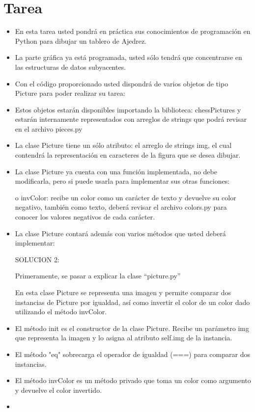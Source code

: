 \documentclass{article}
\begin{document}
	\section{Tarea}
	\begin{itemize}		

 
        \item En esta tarea usted pondrá en práctica sus conocimientos de programación en Python para dibujar un tablero de Ajedrez.
        \item La parte gráfica ya está programada, usted sólo tendrá que concentrarse en las estructuras de datos subyacentes.
        \item Con el código proporcionado usted dispondrá de varios objetos de tipo Picture para poder realizar su tarea:
        \item Estos objetos estarán disponibles importando la biblioteca: chessPictures y estarán internamente representados con arreglos de strings que podrá revisar en el archivo pieces.py 
        \item La clase Picture tiene un sólo atributo: el arreglo de strings img, el cual contendrá la representación en caracteres de la figura que se desea dibujar.

        \item La clase Picture ya cuenta con una función implementada, no debe modificarla, pero si puede usarla para implementar sus otras funciones:

        o invColor: recibe un color como un carácter de texto y devuelve su color negativo, también como texto, deberá revisar el archivo colors.py para conocer los valores negativos de cada carácter.

        \item La clase Picture contará además con varios métodos que usted deberá implementar:

        SOLUCION 2:

        Primeramente, se pasar a explicar la clase “picture.py”
        
        En esta clase Picture se representa una imagen y permite comparar dos instancias de Picture por 
        igualdad, así como invertir el color de un color dado utilizando el método invColor.
        
        \item El método init es el constructor de la clase Picture. Recibe un parámetro img que representa la imagen y lo asigna al atributo self.img de la instancia.
        \item El método "eq" sobrecarga el operador de igualdad (===) para comparar dos instancias.
        \item El método invColor es un método privado que toma un color como argumento y devuelve el 
        color invertido.
        \item[ ]{}


\end{itemize}
\end{document}
